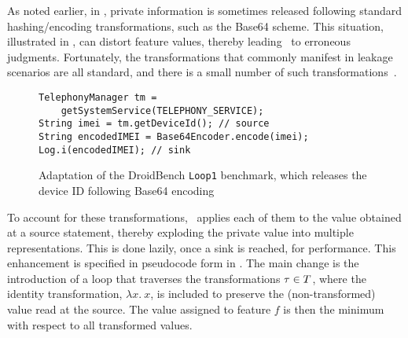  As noted earlier, in , private information is sometimes released following standard hashing/encoding transformations, such as the Base64 scheme. This situation, illustrated in , can distort feature values, thereby leading \Tool\ to erroneous judgments. Fortunately, the transformations that commonly manifest in leakage scenarios are all standard, and there is a small number of such transformations~\cite{HHJSW:CCS11}.

\begin{figure}
\begin{lstlisting}
TelephonyManager tm =
    getSystemService(TELEPHONY_SERVICE);
String imei = tm.getDeviceId(); // source
String encodedIMEI = Base64Encoder.encode(imei);
Log.i(encodedIMEI); // sink
\end{lstlisting}
\caption{\label{Fi:encodedFlow} Adaptation of the DroidBench {\tt Loop1} benchmark, which releases the device ID following Base64 encoding}
\end{figure}

To account for these transformations, \Tool\  applies each of them to the value obtained at a source statement, thereby exploding the private value into multiple representations. This is done lazily, once a sink is reached, for performance. This enhancement is specified in pseudocode form in . The main change is the introduction of a loop that traverses the transformations $\tau \in T$, where the identity transformation, $\lambda x.\ x$, is included to preserve the (non-transformed) value read at the source. The value assigned to feature $f$ is then the minimum with respect to all transformed values.



